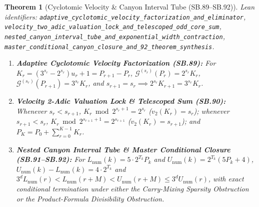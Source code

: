 \documentclass[11pt]{article}
\newtheorem{theorem}{Theorem}[section]
\begin{document}
\begin{theorem}[Cyclotomic Velocity \& Canyon Interval Tube (SB.89--SB.92)]
\emph{Lean identifiers:} \nolinkurl{adaptive_cyclotomic_velocity_factorization_and_eliminator}, \nolinkurl{velocity_two_adic_valuation_lock_and_telescoped_odd_core_sum}, \nolinkurl{nested_canyon_interval_tube_and_exponential_width_contraction}, \nolinkurl{master_conditional_canyon_closure_and_92_theorem_synthesis}.
\begin{enumerate}
  \item \textbf{Adaptive Cyclotomic Velocity Factorization (SB.89):} For $K_r = (3^{s_r} - 2^{s_r}) u_r + 1 = P_{r+1} - P_r$, $\mathcal{G}^{(s_r)}(P_r) = 2^{s_r} K_r$, $\mathcal{G}^{(s_r)}(P_{r+1}) = 3^{s_r} K_r$, and $s_{r+1} = s_r \implies 2^{s_r} K_{r+1} = 3^{s_r} K_r$.
  \item \textbf{Velocity 2-Adic Valuation Lock \& Telescoped Sum (SB.90):} Whenever $s_r < s_{r+1}$, $K_r \bmod 2^{s_r+1} = 2^{s_r}$ ($v_2(K_r) = s_r$); whenever $s_{r+1} < s_r$, $K_r \bmod 2^{s_{r+1}+1} = 2^{s_{r+1}}$ ($v_2(K_r) = s_{r+1}$); and $P_K = P_0 + \sum_{r=0}^{K-1} K_r$.
  \item \textbf{Nested Canyon Interval Tube \& Master Conditional Closure (SB.91--SB.92):} For $L_{\text{num}}(k) = 5 \cdot 2^{T_k} P_k$ and $U_{\text{num}}(k) = 2^{T_k}(5 P_k + 4)$, $U_{\text{num}}(k) - L_{\text{num}}(k) = 4 \cdot 2^{T_k}$ and $3^d L_{\text{num}}(r) < L_{\text{num}}(r+M) < U_{\text{num}}(r+M) \le 3^d U_{\text{num}}(r)$, with exact conditional termination under either the Carry-Mixing Sparsity Obstruction or the Product-Formula Divisibility Obstruction.
\end{enumerate}
\end{theorem}
\end{document}
